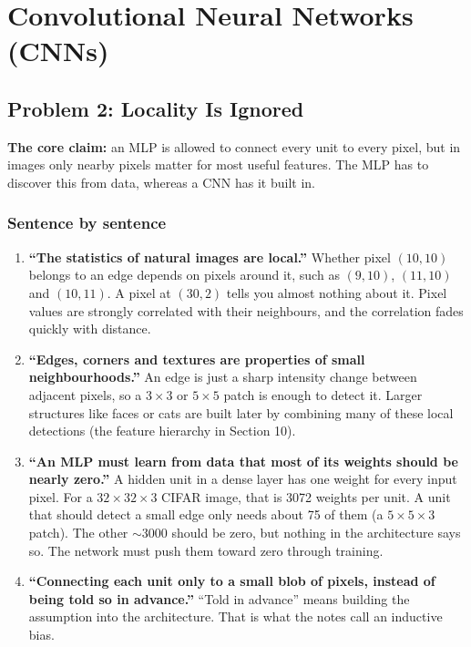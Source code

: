 \section{Convolutional Neural Networks (CNNs)}

\subsection*{Problem 2: Locality Is Ignored}

\textbf{The core claim:} an MLP is allowed to connect every unit to every pixel, but in images only nearby pixels matter for most useful features. The MLP has to discover this from data, whereas a CNN has it built in.

\subsubsection*{Sentence by sentence}

\begin{enumerate}[leftmargin=*]
  \item \textbf{``The statistics of natural images are local.''} Whether pixel $(10,10)$ belongs to an edge depends on pixels around it, such as $(9,10)$, $(11,10)$ and $(10,11)$. A pixel at $(30,2)$ tells you almost nothing about it. Pixel values are strongly correlated with their neighbours, and the correlation fades quickly with distance.
  \item \textbf{``Edges, corners and textures are properties of small neighbourhoods.''} An edge is just a sharp intensity change between adjacent pixels, so a $3\times3$ or $5\times5$ patch is enough to detect it. Larger structures like faces or cats are built later by combining many of these local detections (the feature hierarchy in Section 10).
  \item \textbf{``An MLP must learn from data that most of its weights should be nearly zero.''} A hidden unit in a dense layer has one weight for every input pixel. For a $32\times32\times3$ CIFAR image, that is 3072 weights per unit. A unit that should detect a small edge only needs about 75 of them (a $5\times5\times3$ patch). The other $\sim$3000 should be zero, but nothing in the architecture says so. The network must push them toward zero through training.
  \item \textbf{``Connecting each unit only to a small blob of pixels, instead of being told so in advance.''} ``Told in advance'' means building the assumption into the architecture. That is what the notes call an inductive bias.
\end{enumerate}


